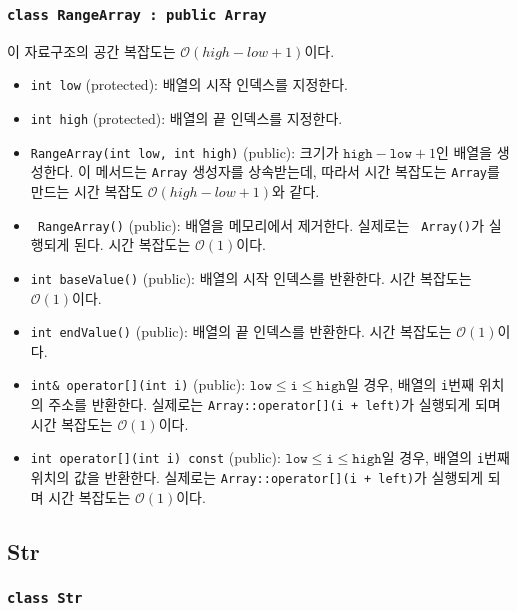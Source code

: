 \subsubsection{\texttt{class RangeArray : public Array}}

이 자료구조의 공간 복잡도는 $\mathcal{O}\left(high - low + 1\right)$이다.

\begin{itemize}
	\item \texttt{int low} (protected): 배열의 시작 인덱스를 지정한다.
	\item \texttt{int high} (protected): 배열의 끝 인덱스를 지정한다.
	\item \texttt{RangeArray(int low, int high)} (public): 크기가 $\texttt{high} - \texttt{low} + 1$인 배열을 생성한다. 이 메서드는 \texttt{Array} 생성자를 상속받는데, 따라서 시간 복잡도는 \texttt{Array}를 만드는 시간 복잡도 $\mathcal{O}\left(high - low + 1\right)$와 같다.
	\item \texttt{~RangeArray()} (public): 배열을 메모리에서 제거한다. 실제로는 \texttt{~Array()}가 실행되게 된다. 시간 복잡도는 $\mathcal{O}\left(1\right)$이다.
	\item \texttt{int baseValue()} (public): 배열의 시작 인덱스를 반환한다. 시간 복잡도는 $\mathcal{O}\left(1\right)$이다.
	\item \texttt{int endValue()} (public): 배열의 끝 인덱스를 반환한다. 시간 복잡도는 $\mathcal{O}\left(1\right)$이다.
	\item \texttt{int& operator[](int i)} (public): $\texttt{low} \leq \texttt{i} \leq \texttt{high}$일 경우, 배열의 \texttt{i}번째 위치의 주소를 반환한다. 실제로는 \texttt{Array::operator[](i + left)}가 실행되게 되며 시간 복잡도는 $\mathcal{O}\left(1\right)$이다.
	\item \texttt{int operator[](int i) const} (public): $\texttt{low} \leq \texttt{i} \leq \texttt{high}$일 경우, 배열의 \texttt{i}번째 위치의 값을 반환한다. 실제로는 \texttt{Array::operator[](i + left)}가 실행되게 되며 시간 복잡도는 $\mathcal{O}\left(1\right)$이다.
\end{itemize}

\subsection{Str}

\subsubsection{\texttt{class Str}}

